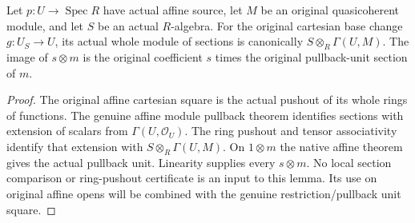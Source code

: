 \begin{lemma}
\label{lem:fc-affine-module-flat-base-change}
\leanok
Let $p:U\to\operatorname{Spec}R$ have actual affine source, let $M$ be
an original quasicoherent module, and let $S$ be an actual $R$-algebra.
For the original cartesian base change $g:U_S\to U$, its actual whole
module of sections is canonically $S\otimes_R\Gamma(U,M)$.
The image of $s\otimes m$ is the original coefficient $s$ times the
original pullback-unit section of $m$.
\end{lemma}
\begin{proof}
The original affine cartesian square is the actual pushout of its
whole rings of functions. The genuine affine module pullback theorem
identifies sections with extension of scalars from $\Gamma(U,\mathcal O_U)$.
The ring pushout and tensor associativity identify that extension with
$S\otimes_R\Gamma(U,M)$. On $1\otimes m$ the native affine theorem gives
the actual pullback unit. Linearity supplies every $s\otimes m$.
No local section comparison or ring-pushout certificate is an input
to this lemma. Its use on original affine opens will be combined with
the genuine restriction/pullback unit square.
\end{proof}
